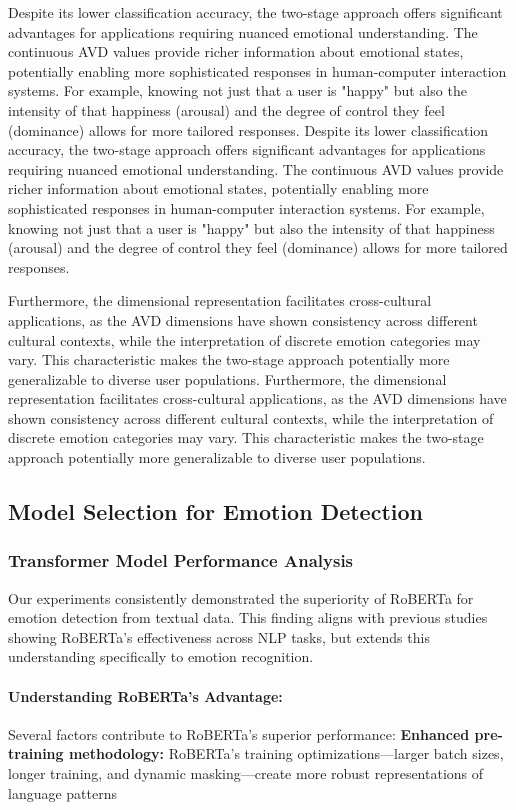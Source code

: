 \documentclass[12pt]{article}
\begin{document}
Despite its lower classification accuracy, the two-stage approach offers significant advantages for applications requiring nuanced emotional understanding. The continuous AVD values provide richer information about emotional states, potentially enabling more sophisticated responses in human-computer interaction systems. For example, knowing not just that a user is "happy" but also the intensity of that happiness (arousal) and the degree of control they feel (dominance) allows for more tailored responses.
Despite its lower classification accuracy, the two-stage approach offers significant advantages for applications requiring nuanced emotional understanding. The continuous AVD values provide richer information about emotional states, potentially enabling more sophisticated responses in human-computer interaction systems. For example, knowing not just that a user is "happy" but also the intensity of that happiness (arousal) and the degree of control they feel (dominance) allows for more tailored responses.

Furthermore, the dimensional representation facilitates cross-cultural applications, as the AVD dimensions have shown consistency across different cultural contexts, while the interpretation of discrete emotion categories may vary. This characteristic makes the two-stage approach potentially more generalizable to diverse user populations.
Furthermore, the dimensional representation facilitates cross-cultural applications, as the AVD dimensions have shown consistency across different cultural contexts, while the interpretation of discrete emotion categories may vary. This characteristic makes the two-stage approach potentially more generalizable to diverse user populations.

\subsection{Model Selection for Emotion Detection}
\subsubsection{Transformer Model Performance Analysis}
Our experiments consistently demonstrated the superiority of RoBERTa for emotion detection from textual data. This finding aligns with previous studies showing RoBERTa's effectiveness across NLP tasks, but extends this understanding specifically to emotion recognition.

\paragraph{Understanding RoBERTa's Advantage:}
Several factors contribute to RoBERTa's superior performance:
    \textbf{Enhanced pre-training methodology:} RoBERTa's training optimizations—larger batch sizes, longer training, and dynamic masking—create more robust representations of language patterns
    
\end{document}
